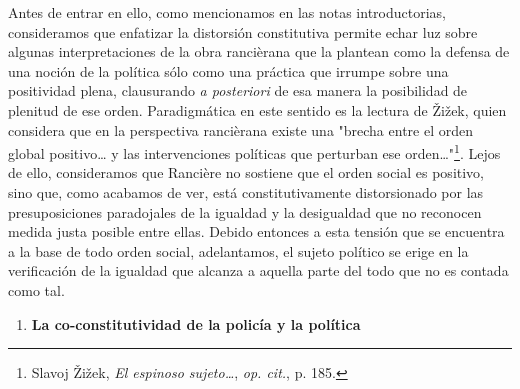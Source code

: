 \documentclass{book}
\begin{document}
Antes de entrar en ello, como mencionamos en las notas introductorias,
consideramos que enfatizar la distorsión constitutiva permite echar luz
sobre algunas interpretaciones de la obra rancièrana que la plantean
como la defensa de una noción de la política sólo como una práctica que
irrumpe sobre una positividad plena, clausurando \emph{a posteriori} de
esa manera la posibilidad de plenitud de ese orden. Paradigmática en
este sentido es la lectura de Žižek, quien considera que en la
perspectiva rancièrana existe una "brecha entre el orden global
positivo\ldots{} y las intervenciones políticas que perturban ese
orden\ldots"\footnote{Slavoj Žižek, \emph{El espinoso sujeto\ldots{}},
  \emph{op. cit.}, p. 185.}. Lejos de ello, consideramos que Rancière no
sostiene que el orden social es positivo, sino que, como acabamos de
ver, está constitutivamente distorsionado por las presuposiciones
paradojales de la igualdad y la desigualdad que no reconocen medida
justa posible entre ellas. Debido entonces a esta tensión que se
encuentra a la base de todo orden social, adelantamos, el sujeto
político se erige en la verificación de la igualdad que alcanza a
aquella parte del todo que no es contada como tal.

\begin{enumerate}
\def\labelenumi{\arabic{enumi}.}
\setcounter{enumi}{2}
\item
  \textbf{La co-constitutividad de la policía y la política}
\end{enumerate}
\end{document}
